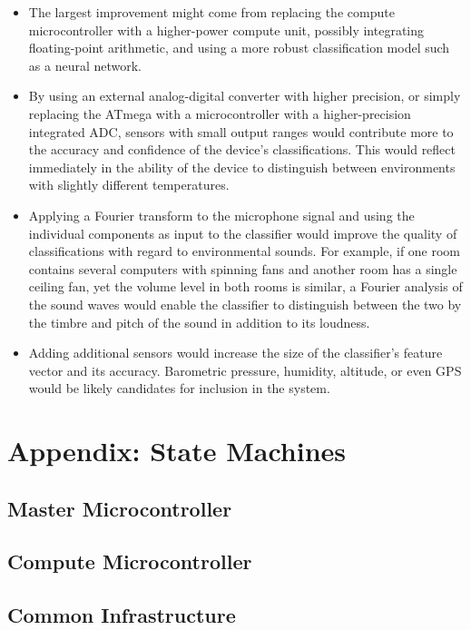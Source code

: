 \documentclass{article}
\begin{document}
\begin{itemize}

  \item The largest improvement might come from replacing the compute
    microcontroller with a higher-power compute unit, possibly
    integrating floating-point arithmetic, and using a more robust
    classification model such as a neural network.

  \item By using an external analog-digital converter with higher
    precision, or simply replacing the ATmega with a microcontroller
    with a higher-precision integrated ADC, sensors with small output
    ranges would contribute more to the accuracy and confidence of the
    device's classifications.  This would reflect immediately in the
    ability of the device to distinguish between environments with
    slightly different temperatures.

  \item Applying a Fourier transform to the microphone signal and using
    the individual components as input to the classifier would improve
    the quality of classifications with regard to environmental sounds.
    For example, if one room contains several computers with spinning
    fans and another room has a single ceiling fan, yet the volume level
    in both rooms is similar, a Fourier analysis of the sound waves
    would enable the classifier to distinguish between the two by the
    timbre and pitch of the sound in addition to its loudness.

  \item Adding additional sensors would increase the size of the
    classifier's feature vector and its accuracy.  Barometric pressure,
    humidity, altitude, or even GPS would be likely candidates for
    inclusion in the system.

\end{itemize}

\appendix

\section{Appendix: State Machines}

\subsection{Master Microcontroller}

\subsection{Compute Microcontroller}

\subsection{Common Infrastructure}
\end{document}
